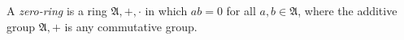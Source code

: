 A \emph{zero-ring} is a ring $\mathfrak{A}, +, \cdot$ in which $ab = 0$ for all $a, b \in \mathfrak{A}$, where the additive group $\mathfrak{A}, +$ is any commutative group.
